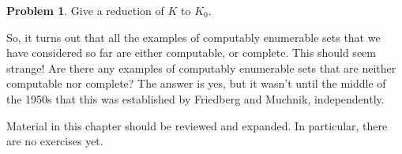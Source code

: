 \documentclass[10pt,a4paper]{article}
\theoremstyle{plain}
\theoremstyle{definition}
\newtheorem{prob}{Problem}[section]
\theoremstyle{remark}
\newenvironment{editorial}{}{}
\newenvironment{digress}{}{}
\newcommand*{\olchapter}[3]{}
\newcommand*{\olimport}[1]{}
\begin{document}
\begin{prob}
Give a reduction of $K$ to $K_0$.
\end{prob}

\begin{digress}
So, it turns out that all the examples of computably enumerable sets
that we have considered so far are either computable, or complete.
This should seem strange!{} Are there any examples of computably
enumerable sets that are neither computable nor complete? The answer
is yes, but it wasn't until the middle of the 1950s that this was
established by Friedberg and Muchnik, independently.
\end{digress}






\olchapter{cmp}{thy}{Computability Theory}

\begin{editorial}
  Material in this chapter should be reviewed and expanded. In
  particular, there are no exercises yet.
\end{editorial}

\olimport{introduction}

\olimport{coding-computations}

\olimport{normal-form}

\olimport{s-m-n}

\olimport{universal-part-function}

\olimport{no-universal-function}

\olimport{halting-problem}

\olimport{russells-paradox}

\olimport{computable-sets}

\olimport{ce-sets}

\olimport{equiv-ce-defs}

\olimport{non-comp-set}

\olimport{ce-closed-cup-cap}

\olimport{complement-ce}

\olimport{reducibility}

\olimport{prop-reduce}

\olimport{complete-ce-sets}

\olimport{k-1}

\olimport{total}

\olimport{rice-theorem}
\end{document}
